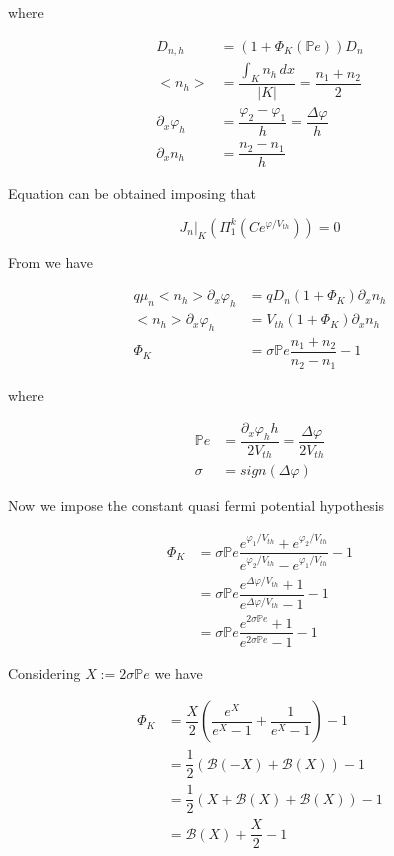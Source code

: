  where 

\begin{align*}
D_{n,h} & = (1+\Phi_K(\mathbb{P}e))D_n \\
<n_h> & = \dfrac{\int_K n_h \, dx}{|K|} = \dfrac{n_1+n_2}{2} \\
\partial_x \varphi_h & = \dfrac{\varphi_2-\varphi_1}{h} = \dfrac{\Delta \varphi}{h}\\
\partial_x n_h & = \dfrac{n_2 - n_1}{h}
\end{align*}

Equation  can be obtained imposing that

\begin{equation}
J_n|_K(\Pi_1^k(Ce^{\varphi / V_{th}})) = 0 
\end{equation}

From  we have

\begin{align*}
q\mu_n <n_h>\partial_x \varphi_h & = q D_ n(1+\Phi_K)\partial_x n_h \\
<n_h>\partial_x \varphi_h & = V_{th}(1+\Phi_K)\partial_x n_h \\
\Phi_K & = \sigma \mathbb{P}e \dfrac{n_1+n_2}{n_2-n_1}  -1
\end{align*}

where 

\begin{align*}
\mathbb{P}e & = \dfrac{\partial_x \varphi_h h}{2V_{th}}  = \dfrac{\Delta \varphi }{2 V_{th}} \\
\sigma & = sign(\Delta \varphi)
\end{align*}


Now we impose the constant quasi fermi potential hypothesis

\begin{align*}
\Phi_K & = \sigma \mathbb{P}e \dfrac{e^{\varphi_1/V_{th}}+e^{\varphi_2/V_{th}}}{e^{\varphi_2/V_{th}}-e^{\varphi_1/V_{th}}} -1 \\
& = \sigma \mathbb{P}e \dfrac{e^{\Delta \varphi/V_{th}}+1}{e^{\Delta \varphi/V_{th}}-1} -1 \\
& = \sigma \mathbb{P}e \dfrac{e^{2 \sigma \mathbb{P}e}+1}{e^{2\sigma \mathbb{P}e}-1} -1
\end{align*}

Considering $X := 2 \sigma \mathbb{P}e$ we have

\begin{align*}
\Phi_K & = \dfrac{X}{2} \left( \dfrac{e^{X}}{e^{X}-1} + \dfrac{1}{e^{X}-1} \right) -1 \\
& = \dfrac{1}{2} \left( \mathcal{B}(-X) + \mathcal{B}(X) \right) -1 \\
 & = \dfrac{1}{2} \left( X + \mathcal{B}(X) + \mathcal{B}(X) \right) -1 \\
  & =  \mathcal{B}(X) +\dfrac{X}{2}  -1
\end{align*}

